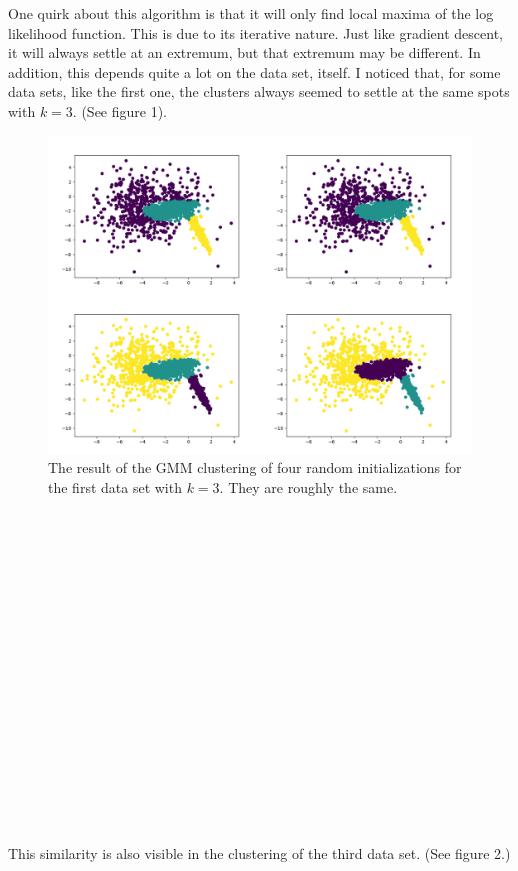 \documentclass{article}
\begin{document}
One quirk about this algorithm is that it will only find local maxima of the 
log likelihood function. This is due to its iterative nature. Just like 
gradient descent, it will always settle at an extremum, but that extremum may be 
different. In addition, this depends quite a lot on the data set, itself. I 
noticed that, for some data sets, like the first one, the clusters always 
seemed to settle at the same spots with $k = 3$. (See figure 1).

\begin{figure}[!ht]
	\centering
	\includegraphics[width=120mm]{figs/gmm_ds0_k3_orthog_plt_4trials.png}
	\caption{The result of the GMM clustering of four random initializations for 
        the first data set with $k = 3$. They are roughly the same.}
\end{figure}

~\\
~\\
~\\
~\\
~\\
~\\
~\\
~\\
~\\
~\\
~\\
~\\
~\\
~\\
~\\
~\\
~\\

This similarity is also visible in the clustering of the third data set. (See figure 2.)
\end{document}
